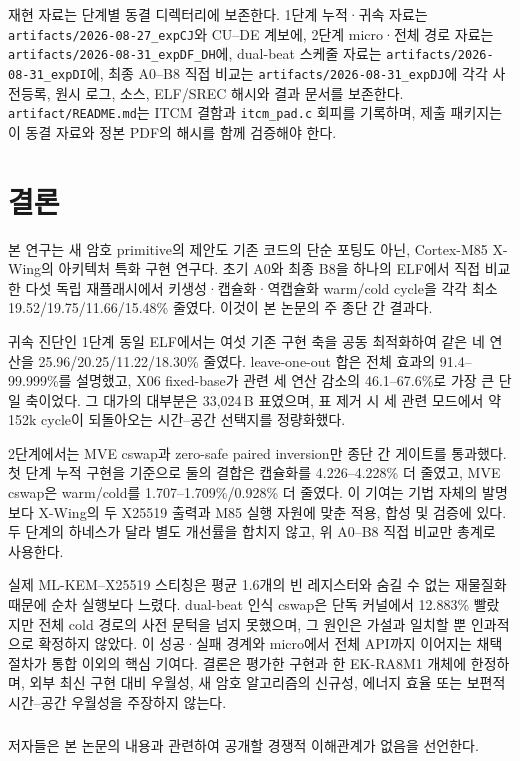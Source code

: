 \documentclass[runningheads,orivec]{llncs}
\newcommand{\xwing}{X-Wing}\newcommand{\slothy}{SLOTHY}\newcommand{\keccak}{Keccak-f[1600]}
\begin{document}
재현 자료는 단계별 동결 디렉터리에 보존한다. 1단계 누적·귀속 자료는
\texttt{artifacts/2026-08-27\_expCJ}와 CU--DE 계보에, 2단계 micro·전체 경로 자료는
\texttt{artifacts/2026-08-31\_expDF\_DH}에, dual-beat 스케줄 자료는
\texttt{artifacts/2026-08-31\_expDI}에, 최종 A0--B8 직접 비교는
\texttt{artifacts/2026-08-31\_expDJ}에 각각 사전등록, 원시 로그, 소스, ELF/SREC 해시와
결과 문서를 보존한다. \texttt{artifact/README.md}는 ITCM 결함과
\texttt{itcm\_pad.c} 회피를 기록하며, 제출 패키지는 이 동결 자료와 정본 PDF의 해시를
함께 검증해야 한다.

\FloatBarrier
\section{결론}\label{sec:conclusion}

본 연구는 새 암호 primitive의 제안도 기존 코드의 단순 포팅도 아닌, Cortex-M85
\xwing{}의 아키텍처 특화 구현 연구다. 초기 A0와 최종 B8을 하나의 ELF에서 직접 비교한
다섯 독립 재플래시에서 키생성·캡슐화·역캡슐화 warm/cold cycle을 각각 최소
19.52/19.75/11.66/15.48\% 줄였다. 이것이 본 논문의 주 종단 간 결과다.

귀속 진단인 1단계 동일 ELF에서는 여섯 기존 구현 축을 공동 최적화하여 같은 네 연산을
25.96/20.25/11.22/18.30\% 줄였다. leave-one-out 합은 전체 효과의
91.4--99.999\%를 설명했고, X06 fixed-base가 관련 세 연산 감소의 46.1--67.6\%로
가장 큰 단일 축이었다. 그 대가의 대부분은 33,024\,B 표였으며, 표 제거 시 세 관련
모드에서 약 152k cycle이 되돌아오는 시간--공간 선택지를 정량화했다.

2단계에서는 MVE cswap과 zero-safe paired inversion만 종단 간 게이트를 통과했다.
첫 단계 누적 구현을 기준으로 둘의 결합은 캡슐화를 4.226--4.228\% 더 줄였고, MVE
cswap은 warm/cold를 1.707--1.709\%/0.928\% 더 줄였다. 이 기여는 기법 자체의 발명보다
\xwing{}의 두 X25519 출력과 M85 실행 자원에 맞춘 적용, 합성 및 검증에 있다. 두 단계의
하네스가 달라 별도 개선률을 합치지 않고, 위 A0--B8 직접 비교만 총계로 사용한다.

실제 ML-KEM--X25519 스티칭은 평균 1.6개의 빈 레지스터와 숨길 수 없는 재물질화 때문에
순차 실행보다 느렸다. dual-beat 인식 cswap은 단독 커널에서 12.883\% 빨랐지만 전체 cold
경로의 사전 문턱을 넘지 못했으며, 그 원인은 가설과 일치할 뿐 인과적으로 확정하지 않았다.
이 성공·실패 경계와 micro에서 전체 API까지 이어지는
채택 절차가 통합 이외의 핵심 기여다. 결론은 평가한 구현과 한 EK-RA8M1 개체에 한정하며,
외부 최신 구현 대비 우월성, 새 암호 알고리즘의 신규성, 에너지 효율 또는 보편적
시간--공간 우월성을 주장하지 않는다.

\begin{credits}
\subsubsection{\discintname}
저자들은 본 논문의 내용과 관련하여 공개할 경쟁적 이해관계가 없음을 선언한다.
\end{credits}

\enlargethispage{5\baselineskip}
{\sloppy

}
\end{document}
